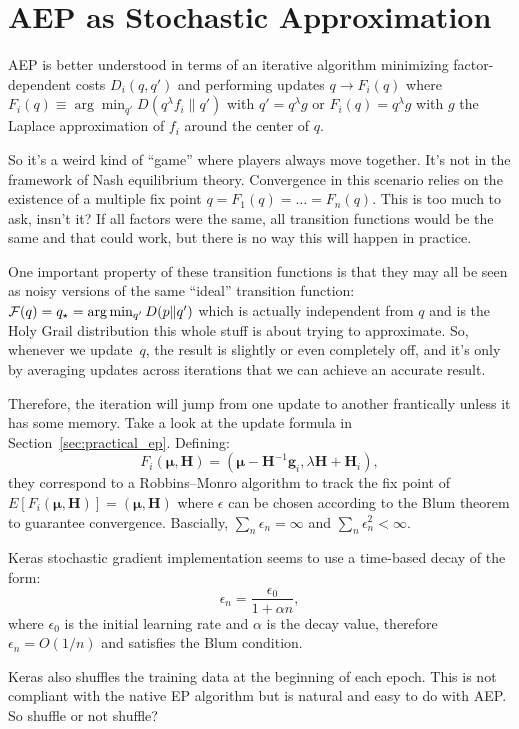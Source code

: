 \documentclass{article}
\def\m{{\boldsymbol{\mu}}}
\def\H{\mathbf{H}}
\def\g{\mathbf{g}}
\begin{document}
\section{AEP as Stochastic Approximation}

AEP is better understood in terms of an iterative algorithm minimizing factor-dependent costs $D_i(q,q')$ and performing updates $q\to F_i(q)$ where  $F_i(q)\equiv \arg\min_{q'}D(q^\lambda f_i\|q')$ with $q'=q^\lambda g$ or $F_i(q)=q^\lambda g$ with $g$ the Laplace approximation of $f_i$ around the center of $q$.

So it's a weird kind of ``game'' where players always move together. It's not in the framework of Nash equilibrium theory. Convergence in this scenario relies on the existence of a multiple fix point $q=F_1(q)=\ldots=F_n(q)$. This is too much to ask, insn't it? If all factors were the same, all transition functions would be the same and that could work, but there is no way this will happen in practice.

One important property of these transition functions is that they may all be seen as noisy versions of the same ``ideal'' transition function: ${\cal F}(q)=q_\star=\arg\min_{q'}D(p\|q')$ which is actually independent from $q$ and is the Holy Grail distribution this whole stuff is about trying to approximate. So, whenever we update~$q$, the result is slightly or even completely off, and it's only by averaging updates across iterations that we can achieve an accurate result.

Therefore, the iteration will jump from one update to another frantically unless it has some memory. Take a look at the update formula in Section~\ref{sec:practical_ep}. Defining:
$$
F_i(\m, \H) = (\m-\H^{-1}\g_i, \lambda\H+\H_i),
$$
they correspond to a Robbins–Monro algorithm to track the fix point of $E[F_i(\m,\H)]=(\m,\H)$ where $\epsilon$ can be chosen according to the Blum theorem to guarantee convergence. Bascially, $\sum_n\epsilon_n=\infty$ and $\sum_n\epsilon_n^2<\infty$.

Keras stochastic gradient implementation seems to use a time-based decay of the form:
$$
\epsilon_n = \frac{\epsilon_0}{1 + \alpha n},
$$
where $\epsilon_0$ is the initial learning rate and $\alpha$ is the decay value, therefore $\epsilon_n=O(1/n)$ and satisfies the Blum condition. 

Keras also shuffles the training data at the beginning of each epoch. This is not compliant with the native EP algorithm but is natural and easy to do with AEP. So shuffle or not shuffle? 
\end{document}

